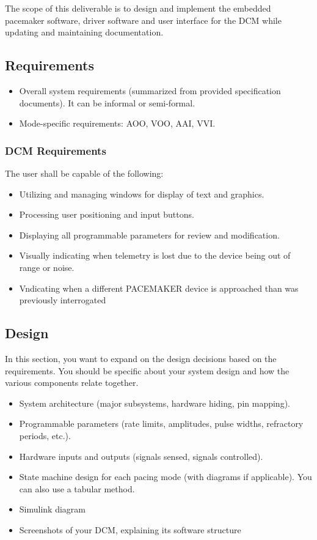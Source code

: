 \documentclass{article}
\begin{document}
The scope of this deliverable is to design and implement the embedded pacemaker software, driver software and user interface for 
the DCM while updating and maintaining documentation. 



\subsection{Requirements}

\begin{itemize}
    \item Overall system requirements (summarized from provided specification documents). It can be informal or semi-formal.
    \item Mode-specific requirements: AOO, VOO, AAI, VVI.
\end{itemize}

\subsubsection{DCM Requirements}
The user shall be capable of the following:
\begin{itemize}
    \item Utilizing and managing windows for display of text and graphics.
    \item Processing user positioning and input buttons.
    \item Displaying all programmable parameters for review and modification.
    \item Visually indicating when telemetry is lost due to the device being out of range or noise.
    \item Vndicating when a different PACEMAKER device is approached than was previously interrogated
\end{itemize}

\subsection{Design}

In this section, you want to expand on the design decisions based on the requirements. You should be specific about your system design and how the various components relate together.

\begin{itemize}
    \item System architecture (major subsystems, hardware hiding, pin mapping).
    \item Programmable parameters (rate limits, amplitudes, pulse widths, refractory periods, etc.).
    \item Hardware inputs and outputs (signals sensed, signals controlled).
    \item State machine design for each pacing mode (with diagrams if applicable). You can also use a tabular method.
    \item Simulink diagram
    \item Screenshots of your DCM, explaining its software structure
\end{itemize}
\end{document}
